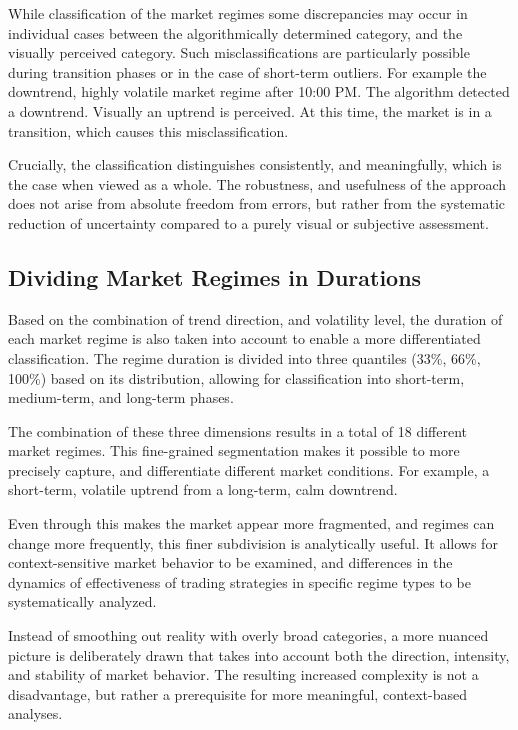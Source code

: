 While classification of the market regimes some discrepancies may occur in individual cases between the algorithmically determined category, and the visually perceived category.
Such misclassifications are particularly possible during transition phases or in the case of short-term outliers.
For example the downtrend, highly volatile market regime after 10:00 PM.
The algorithm detected a downtrend.
Visually an uptrend is perceived.
At this time, the market is in a transition, which causes this misclassification.

Crucially, the classification distinguishes consistently, and meaningfully, which is the case when viewed as a whole.
The robustness, and usefulness of the approach does not arise from absolute freedom from errors, but rather from the systematic reduction of uncertainty compared to a purely visual or subjective assessment.

\subsection{Dividing Market Regimes in Durations}

Based on the combination of trend direction, and volatility level, the duration of each market regime is also taken into account to enable a more differentiated classification.
The regime duration is divided into three quantiles (33\%, 66\%, 100\%) based on its distribution, allowing for classification into short-term, medium-term, and long-term phases.

The combination of these three dimensions results in a total of 18 different market regimes.
This fine-grained segmentation makes it possible to more precisely capture, and differentiate different market conditions.
For example, a short-term, volatile uptrend from a long-term, calm downtrend.

Even through this makes the market appear more fragmented, and regimes can change more frequently, this finer subdivision is analytically useful.
It allows for context-sensitive market behavior to be examined, and differences in the dynamics of effectiveness of trading strategies in specific regime types to be systematically analyzed.

Instead of smoothing out reality with overly broad categories, a more nuanced picture is deliberately drawn that takes into account both the direction, intensity, and stability of market behavior.
The resulting increased complexity is not a disadvantage, but rather a prerequisite for more meaningful, context-based analyses.

